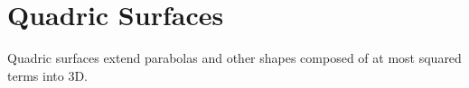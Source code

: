 \section{Quadric Surfaces}
\noindent
Quadric surfaces extend parabolas and other shapes composed of at most squared terms into 3D.





